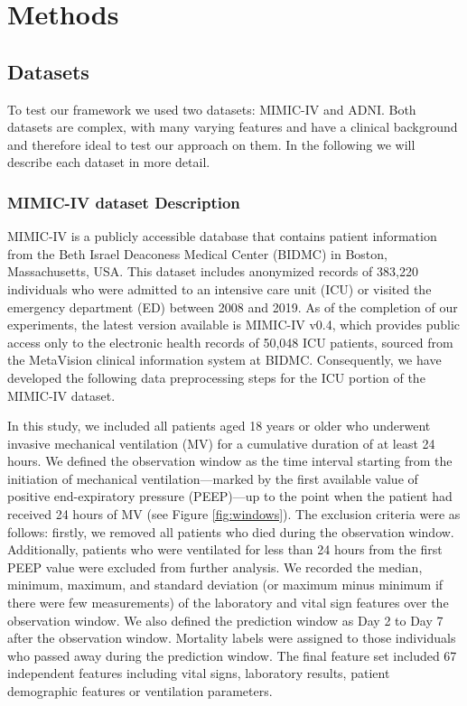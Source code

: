 \documentclass{article}
\begin{document}
\section{Methods}

\subsection{Datasets}
To test our framework we used two datasets: MIMIC-IV and ADNI. Both datasets are complex, with many varying features and have a clinical background and therefore ideal to test our approach on them. In the following we will describe each dataset in more detail.

\subsubsection{MIMIC-IV dataset Description}
MIMIC-IV \cite{johnson2021mimic,goldberger2000physiobank} is a publicly accessible database that contains patient information from the Beth Israel Deaconess Medical Center (BIDMC) in Boston, Massachusetts, USA. This dataset includes anonymized records of 383,220 individuals who were admitted to an intensive care unit (ICU) or visited the emergency department (ED) between 2008 and 2019. As of the completion of our experiments, the latest version available is MIMIC-IV v0.4, which provides public access only to the electronic health records of 50,048 ICU patients, sourced from the MetaVision clinical information system at BIDMC. Consequently, we have developed the following data preprocessing steps for the ICU portion of the MIMIC-IV dataset.

In this study, we included all patients aged 18 years or older who underwent invasive mechanical ventilation (MV) for a cumulative duration of at least 24 hours. We defined the observation window as the time interval starting from the initiation of mechanical ventilation—marked by the first available value of positive end-expiratory pressure (PEEP)—up to the point when the patient had received 24 hours of MV (see Figure \ref{fig:windows}). 
The exclusion criteria were as follows: firstly, we removed all patients who died during the observation window. Additionally, patients who were ventilated for less than 24 hours from the first PEEP value were excluded from further analysis. 
We recorded the median, minimum, maximum, and standard deviation (or maximum minus minimum if there were few measurements) of the laboratory and vital sign features over the observation window. 
We also defined the prediction window as Day 2 to Day 7 after the observation window. Mortality labels were assigned to those individuals who passed away during the prediction window. The final feature set included 67 independent features including vital signs, laboratory results, patient demographic features or ventilation parameters.
\end{document}
